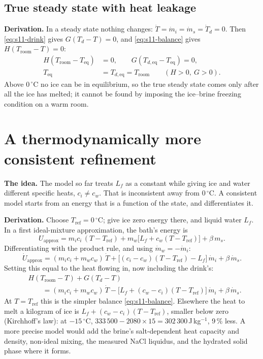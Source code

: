 \documentclass[11pt,a4paper]{article}
\newcommand{\dC}{\,{}^{\circ}\mathrm{C}}
\newcommand{\Troom}{T_{\mathrm{room}}}
\newcommand{\para}[1]{\par\smallskip\noindent\textbf{#1}\enspace}
\begin{document}
\subsection{True steady state with heat leakage}
\para{Derivation.} In a steady state nothing changes: $\dot T = \dot m_i = \dot m_s = \dot T_d = 0$. Then
\eqref{eq:s11-drink} gives $G(T_d - T) = 0$, and \eqref{eq:s11-balance} gives $H(\Troom - T) = 0$:
\begin{align}
H(\Troom - T_{\mathrm{eq}}) &= 0,\qquad G(T_{d,\mathrm{eq}} - T_{\mathrm{eq}}) = 0, \label{eq:s12-steady}\\
T_{\mathrm{eq}} &= T_{d,\mathrm{eq}} = \Troom\qquad (H > 0,\ G > 0). \label{eq:s12-Teq}
\end{align}
Above $0\dC$ no ice can be in equilibrium, so the true steady state comes only after all the ice has melted;
it cannot be found by imposing the ice--brine freezing condition on a warm room.

\section{A thermodynamically more consistent refinement}\label{sec:refine}

\para{The idea.} The model so far treats $L_f$ as a constant while giving ice and water different specific
heats, $c_i \ne c_w$. That is inconsistent away from $0\dC$. A consistent model starts from an energy that is a
function of the state, and differentiates it.

\para{Derivation.} Choose $T_{\mathrm{ref}} = 0\dC$; give ice zero energy there, and liquid water $L_f$.
In a first ideal-mixture approximation, the bath's energy is
\begin{equation}
U_{\mathrm{approx}} = m_ic_i\,(T - T_{\mathrm{ref}}) + m_w\big[L_f + c_w(T - T_{\mathrm{ref}})\big] + \beta\,m_s . \label{eq:refine-U}
\end{equation}
Differentiating with the product rule, and using $\dot m_w = -\dot m_i$:
\begin{equation}
\dot U_{\mathrm{approx}} = (m_ic_i + m_wc_w)\,\dot T + \big[(c_i - c_w)(T - T_{\mathrm{ref}}) - L_f\big]\,\dot m_i + \beta\,\dot m_s . \label{eq:refine-Udot}
\end{equation}
Setting this equal to the heat flowing in, now including the drink's:
\begin{equation}
\begin{split}
&H(\Troom - T) + G(T_d - T)\\
&\qquad= (m_ic_i + m_wc_w)\,\dot T - \big[L_f + (c_w - c_i)(T - T_{\mathrm{ref}})\big]\,\dot m_i + \beta\,\dot m_s .
\end{split}
\label{eq:refine-balance}
\end{equation}
At $T = T_{\mathrm{ref}}$ this is the simpler balance \eqref{eq:s11-balance}. Elsewhere the heat to melt a
kilogram of ice is $L_f + (c_w - c_i)(T - T_{\mathrm{ref}})$, smaller below zero (Kirchhoff's law): at
$-15\dC$, $333\,500 - 2080\times15 = 302\,300$\,J\,kg$^{-1}$, 9\,\% less. A more precise model would add the
brine's salt-dependent heat capacity and density, non-ideal mixing, the measured NaCl liquidus, and the
hydrated solid phase where it forms.
\end{document}
